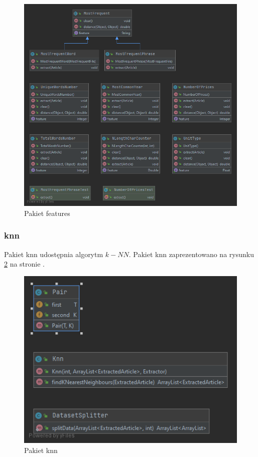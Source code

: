\documentclass{classrep}
\begin{document}
\begin{figure}[H]
\label{feat2}
\includegraphics[scale=0.5]{Package features}
\caption{Pakiet features}
\end{figure}


\subsubsection{knn}
Pakiet knn udostępnia algorytm $k-NN$. Pakiet knn zaprezentowano na rysunku \ref{knn} na stronie \pageref{knn}.
\begin{figure}[H]
\label{knn}
\includegraphics[scale=0.5]{Package knn}
\caption{Pakiet knn}
\end{figure}
\end{document}
